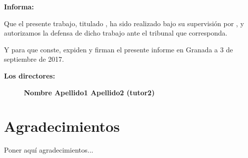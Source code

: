 


\textbf{Informa:}

\vspace{0.5cm}

Que el presente trabajo, titulado \textit{\textbf{\myTitle}},
ha sido realizado bajo su supervisión por \textbf{\myName}, y autorizamos la defensa de dicho trabajo ante el tribunal
que corresponda.

\vspace{0.5cm}

Y para que conste, expiden y firman el presente informe en Granada a 3 de septiembre de 2017.

\vspace{1cm}

\textbf{Los directores:}

\vspace{5cm}

\noindent \textbf{\myProf \ \ \ \ \ Nombre Apellido1 Apellido2 (tutor2)}

\chapter*{Agradecimientos}
\thispagestyle{empty}

       \vspace{1cm}


Poner aquí agradecimientos...

